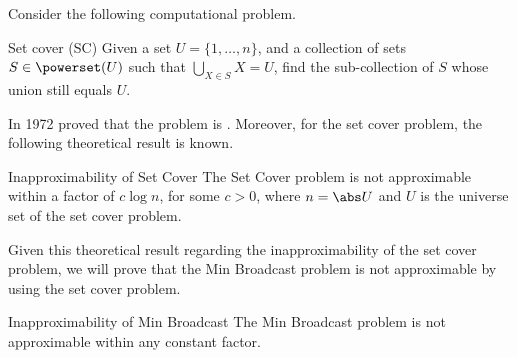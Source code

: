 \documentclass[a4paper, 12pt]{report}
\begin{document}
    Consider the following computational problem.

    \begin{frameddefn}[label={set cover}]{Set cover (SC)}
        Given a  set $U = \{1, \ldots, n\}$, and a collection of sets $S \in \powerset(U)$ such that $\bigcup_{X \in S}{X} = U$, find the  sub-collection of $S$ whose union still equals $U$.
    \end{frameddefn}

    In 1972 \textcite{karp} proved that the  problem is \NPComplete. Moreover, for the set cover problem, the following theoretical result is known.

    \begin{framedthm}[label={sc inapprox}]{Inapproximability of Set Cover}
        The Set Cover problem is not approximable within a factor of $c \log n$, for some $c > 0$, where $n = \abs U$ and $U$ is the universe set of the set cover problem.
    \end{framedthm}

    Given this theoretical result regarding the inapproximability of the set cover problem, we will prove that the Min Broadcast problem is not approximable by using the set cover problem.

    \begin{framedthm}{Inapproximability of Min Broadcast}
        The Min Broadcast problem is not approximable within any constant factor.
    \end{framedthm}
\end{document}

